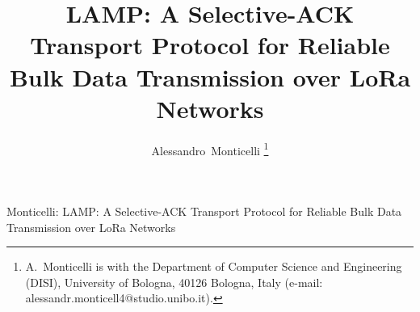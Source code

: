 \documentclass[journal]{IEEEtran}
\begin{document}
%
\title{LAMP: A Selective-ACK Transport Protocol for Reliable Bulk Data Transmission over LoRa Networks}
%
%
%

\author{Alessandro~Monticelli%
\thanks{A.~Monticelli is with the Department of Computer Science and Engineering (DISI), University of Bologna, 40126 Bologna, Italy (e-mail: alessandr.monticell4@studio.unibo.it).}%
}

% 
%



%
{Monticelli: LAMP: A Selective-ACK Transport Protocol for Reliable Bulk Data Transmission over LoRa Networks}
% 
\end{document}
